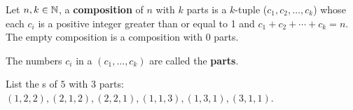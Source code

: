 \documentclass[english, 11pt]{article}
\begin{document}
  \begin{defn}[composition]\label{composition}
  Let $n,k \in {\mathbb{N}}$, a \textbf{composition} of $n$ with $k$ parts is a $k$-tuple ($c_1,c_2,\ldots,c_k$) whose each $c_i$ is a positive integer greater than or equal to 1 and $c_1 + c_2 + \cdots + c_k = n$. The empty composition is a composition with 0 parts.
  \end{defn}

\begin{defn}[parts]\label{parts}
     The numbers $c_i$ in a  $(c_1, \ldots, c_k)$ are called the \textbf{parts}.
   \end{defn}

  \begin{exmp}
    List the s of $5$ with 3 parts: $(1,2,2), (2,1,2), (2,2,1), (1,1,3), (1,3,1), (3,1,1)$.
  \end{exmp}
\end{document}
